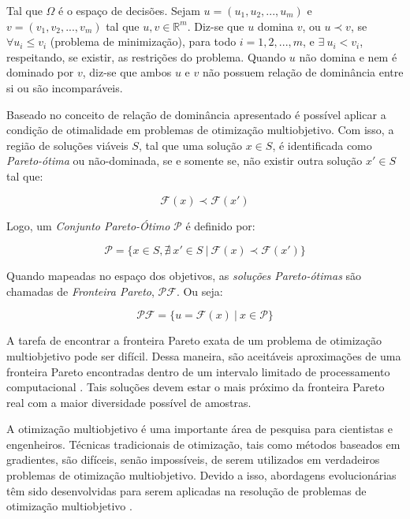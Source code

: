\documentclass[
	12pt,				%
	openany,			%
	oneside,	
	a4paper,			%
	brazil,				%
	]{unimontes-ppgmsc-abntex2}
\begin{document}
Tal que $\Omega$ é o espaço de decisões. Sejam  $u = (u_1,u_2,...,u_m)$ e $v = (v_1,v_2,...,v_m)$ tal que $u,v \in \mathbb{R}^m$. Diz-se que $u$ domina $v$, ou $u \prec v$, se $\forall u_i \leq v_i$ (problema de minimização), para todo $i=1,2,...,m$, e $\exists\ u_i < v_i$, respeitando, se existir, as restrições do problema. Quando $u$ não domina e nem é dominado por $v$, diz-se que ambos $u$ e $v$ não possuem relação de dominância entre si ou são incomparáveis.

Baseado no conceito de relação de dominância apresentado é possível aplicar a condição de otimalidade em problemas de otimização multiobjetivo. Com isso, a região de soluções viáveis $S$, tal que uma solução $x \in S$, é identificada como {\em Pareto-ótima} ou não-dominada, se e somente se, não existir outra solução $x' \in S$ tal que:

\begin{equation}
\label{eq:dominancia}
\mathcal{F}(x) \prec \mathcal{F}(x')
\end{equation}

Logo, um {\em Conjunto Pareto-Ótimo} $\mathcal{P}$ é definido por:

\begin{equation}
\label{eq:conj_pareto}
\mathcal{P} = \{x \in S, \nexists\ x' \in S\ |\ \mathcal{F}(x) \prec \mathcal{F}(x')\}
\end{equation}

Quando mapeadas no espaço dos objetivos, as {\em soluções Pareto-ótimas} são chamadas de {\em Fronteira Pareto}, $\mathcal{PF}$. Ou seja:

\begin{equation}
\label{eq:front_pareto}
\mathcal{PF} = \{ u = \mathcal{F}(x)\ |\ x \in \mathcal{P} \}
\end{equation}

A tarefa de encontrar a fronteira Pareto exata de um problema de otimização multiobjetivo pode ser difícil. Dessa maneira, são aceitáveis aproximações de uma fronteira Pareto encontradas dentro de um intervalo limitado de processamento computacional \cite{Coello_2006}. Tais soluções devem estar o mais próximo da fronteira Pareto real com a maior diversidade possível de amostras. 

A otimização multiobjetivo é uma importante área de pesquisa para cientistas e engenheiros. Técnicas tradicionais de otimização, tais como métodos baseados em gradientes, são difíceis, senão impossíveis, de serem utilizados em verdadeiros problemas de otimização multiobjetivo. Devido a isso, abordagens evolucionárias têm sido desenvolvidas para serem aplicadas na resolução de problemas de otimização multiobjetivo \cite{Hu_2003}. 
\end{document}
